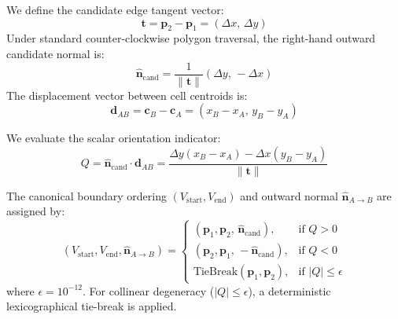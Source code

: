 \documentclass[10pt,twocolumn,a4paper]{article}
\begin{document}
We define the candidate edge tangent vector:
\begin{equation}
\mathbf{t} = \mathbf{p}_2 - \mathbf{p}_1 = (\Delta x, \, \Delta y)
\end{equation}
Under standard counter-clockwise polygon traversal, the right-hand outward candidate normal is:
\begin{equation}
\hat{\mathbf{n}}_{\text{cand}} = \frac{1}{\|\mathbf{t}\|} (\Delta y, \, -\Delta x)
\end{equation}
The displacement vector between cell centroids is:
\begin{equation}
\mathbf{d}_{AB} = \mathbf{c}_B - \mathbf{c}_A = (x_B - x_A, \, y_B - y_A)
\end{equation}

We evaluate the scalar orientation indicator:
\begin{equation}
Q = \hat{\mathbf{n}}_{\text{cand}} \cdot \mathbf{d}_{AB} = \frac{\Delta y (x_B - x_A) - \Delta x (y_B - y_A)}{\|\mathbf{t}\|}
\end{equation}

The canonical boundary ordering $(V_{\text{start}}, V_{\text{end}})$ and outward normal $\hat{\mathbf{n}}_{A \to B}$ are assigned by:
\begin{equation}
(V_{\text{start}}, V_{\text{end}}, \hat{\mathbf{n}}_{A \to B}) = 
\begin{cases} 
(\mathbf{p}_1, \mathbf{p}_2, \, \hat{\mathbf{n}}_{\text{cand}}), & \text{if } Q > 0 \\
(\mathbf{p}_2, \mathbf{p}_1, \, -\hat{\mathbf{n}}_{\text{cand}}), & \text{if } Q < 0 \\
\text{TieBreak}(\mathbf{p}_1, \mathbf{p}_2), & \text{if } |Q| \le \epsilon
\end{cases}
\end{equation}
where $\epsilon = 10^{-12}$. For collinear degeneracy ($|Q| \le \epsilon$), a deterministic lexicographical tie-break is applied.
\end{document}
